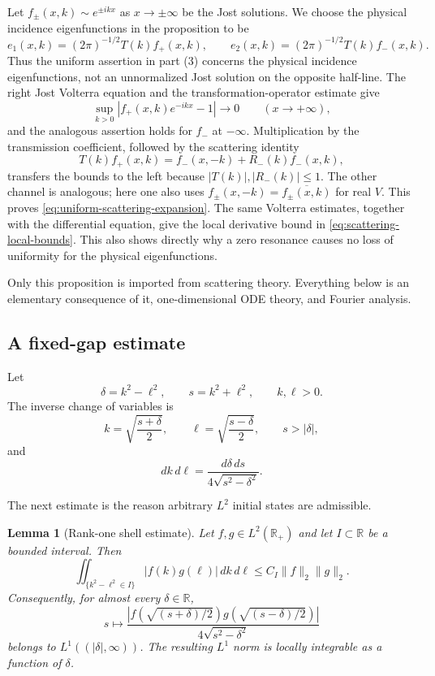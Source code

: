 \documentclass[11pt]{amsart}
\newtheorem{lemma}[theorem]{Lemma}
\numberwithin{equation}{section}
\theoremstyle{remark}
\newcommand{\R}{\mathbb R}
\begin{document}
Let $f_\pm(x,k)\sim e^{\pm ikx}$ as $x\to\pm\infty$ be the Jost
solutions.  We choose the physical incidence
eigenfunctions in the proposition to be
\[
 e_1(x,k)=(2\pi)^{-1/2}T(k)f_+(x,k),
 \qquad
 e_2(x,k)=(2\pi)^{-1/2}T(k)f_-(x,k).
\]
Thus the uniform assertion in part (3) concerns the physical incidence
eigenfunctions, not an unnormalized Jost solution on the opposite half-line.
The right Jost Volterra equation and the transformation-operator estimate give
\[
 \sup_{k>0}|f_+(x,k)e^{-ikx}-1|\longrightarrow0
 \qquad (x\to+\infty),
\]
and the analogous assertion holds for $f_-$ at $-\infty$.  Multiplication by
the transmission coefficient, followed by the scattering identity
\[
 T(k)f_+(x,k)=f_-(x,-k)+R_-(k)f_-(x,k),
\]
transfers the bounds to the left because $|T(k)|,|R_-(k)|\le1$.  The other
channel is analogous; here one also uses
$f_\pm(x,-k)=\overline{f_\pm(x,k)}$ for real $V$.  This proves
\eqref{eq:uniform-scattering-expansion}.  The same Volterra estimates, together
with the differential equation, give the local derivative bound in
\eqref{eq:scattering-local-bounds}.  This also shows directly why a zero
resonance causes no loss of uniformity for the physical eigenfunctions.

Only this proposition is imported from scattering theory.  Everything below is
an elementary consequence of it, one-dimensional ODE theory, and Fourier
analysis.

\subsection{A fixed-gap estimate}

Let
\[
 \delta=k^2-\ell^2,
 \qquad
 s=k^2+\ell^2,
 \qquad k,\ell>0.
\]
The inverse change of variables is
\[
 k=\sqrt{\frac{s+\delta}{2}},
 \qquad
 \ell=\sqrt{\frac{s-\delta}{2}},
 \qquad s>|\delta|,
\]
and
\begin{equation}
 dk\,d\ell
 =\frac{d\delta\,ds}{4\sqrt{s^2-\delta^2}}.
 \label{eq:gap-sum-jacobian}
\end{equation}

The next estimate is the reason arbitrary $L^2$ initial states are admissible.

\begin{lemma}[Rank-one shell estimate]\label{lem:shell}
Let $f,g\in L^2(\R_+)$ and let $I\subset\R$ be a bounded interval.  Then
\begin{equation}
 \iint_{\{k^2-\ell^2\in I\}}
 |f(k)g(\ell)|\,dk\,d\ell
 \le C_I\|f\|_2\|g\|_2.
 \label{eq:shell-schur}
\end{equation}
Consequently, for almost every $\delta\in\R$,
\begin{equation}
 s\longmapsto
 \frac{
 |f(\sqrt{(s+\delta)/2})
 g(\sqrt{(s-\delta)/2})|
 }{4\sqrt{s^2-\delta^2}}
 \label{eq:shell-density}
\end{equation}
belongs to $L^1((|\delta|,\infty))$.  The resulting $L^1$ norm is locally
integrable as a function of $\delta$.
\end{lemma}
\end{document}
